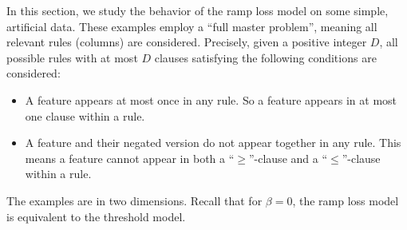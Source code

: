 In this section, we study the behavior of the ramp loss model on some simple, artificial data.
These examples employ a ``full master problem'', meaning all relevant rules (columns) are considered.
Precisely, given a positive integer $D$, all possible rules with at most $D$ clauses satisfying the following conditions are considered:
\begin{itemize}
    \item A feature appears at most once in any rule.
    So a feature appears in at most one clause within a rule.
    \item A feature and their negated version do not appear together in any rule.
    This means a feature cannot appear in both a ``$\geq$''-clause and a ``$\leq$''-clause within a rule.
\end{itemize}
The examples are in two dimensions.
Recall that for $\beta = 0$, the ramp loss model is equivalent to the threshold model.

